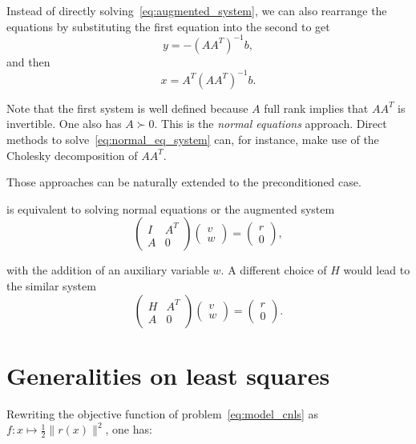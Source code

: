 \documentclass[10pt]{article}
\numberwithin{equation}{section}
\begin{document}
	 Instead of directly solving~\eqref{eq:augmented_system}, we can also rearrange the equations by substituting the first equation into the second to get
	 \[y=-(AA^T)^{-1}b,\]
	 and then 
	 \begin{equation}\label{eq:normal_eq_system}
	 	x = A^T(AA^T)^{-1}b.
	 \end{equation}
	 
	 Note that the first system is well defined because $A$ full rank implies that $AA^T$ is invertible. One also has $A\succ 0$. This is the \textit{normal equations} approach. Direct methods to solve~\eqref{eq:normal_eq_system} can, for instance, make use of the Cholesky decomposition of $AA^T$.
	 
	 Those approaches can be naturally extended to the preconditioned case. 
	 
	 is equivalent to solving normal equations or the augmented system
	 \[\begin{pmatrix}
	 	I & A^T \\
	 	A & 0
	 \end{pmatrix} \begin{pmatrix}
	 	v \\ w 
	 \end{pmatrix} = \begin{pmatrix}
	 	r \\ 0
	 \end{pmatrix},\]
	 
	 with the addition of an auxiliary variable $w$. A different choice of $H$ would lead to the similar system
	 \begin{equation}\label{eq:augmented_system_preconditionned}
	 	\begin{pmatrix}
	 		H & A^T \\
	 		A & 0
	 	\end{pmatrix} \begin{pmatrix}
	 		v \\ w 
	 	\end{pmatrix} = \begin{pmatrix}
	 		r \\ 0
	 	\end{pmatrix}.
	 \end{equation}
	 
	\section{Generalities on least squares}
	 
	 Rewriting the objective function of problem~\eqref{eq:model_cnls} as $f\colon x \mapsto  \frac{1}{2} \|r(x)\|^2$, one has:
	 
\end{document}

